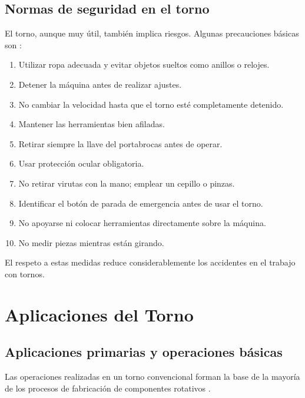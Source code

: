 \documentclass[12pt,a4paper]{article}
\begin{document}
\subsection{Normas de seguridad en el torno}
\label{subsec:seguridad}
El torno, aunque muy útil, también implica riesgos. Algunas precauciones básicas son \cite{lascano2015}:
\begin{enumerate}[itemsep=1pt, topsep=1pt, parsep=0pt]
    \item Utilizar ropa adecuada y evitar objetos sueltos como anillos o relojes.
    \item Detener la máquina antes de realizar ajustes.
    \item No cambiar la velocidad hasta que el torno esté completamente detenido.
    \item Mantener las herramientas bien afiladas.
    \item Retirar siempre la llave del portabrocas antes de operar.
    \item Usar protección ocular obligatoria.
    \item No retirar virutas con la mano; emplear un cepillo o pinzas.
    \item Identificar el botón de parada de emergencia antes de usar el torno.
    \item No apoyarse ni colocar herramientas directamente sobre la máquina.
    \item No medir piezas mientras están girando.
    \end{enumerate}
El respeto a estas medidas reduce considerablemente los accidentes en el trabajo con tornos.

\vspace{4pt}
\noindent{\color{utablue!30}\rule{\textwidth}{0.5pt}}
\vspace{2pt}
\section{Aplicaciones del Torno}
\label{sec:aplicaciones}

\subsection{Aplicaciones primarias y operaciones básicas}
Las operaciones realizadas en un torno convencional forman la base de la mayoría de los procesos de fabricación de componentes rotativos \cite{chapman2006, degarmo2011}.
\end{document}
